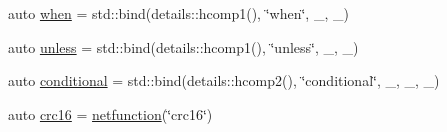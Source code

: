 \begin{DoxyCompactItemize}
\item 
auto \hyperlink{namespacepfq__lang_1_1anonymous__namespace_02default_8hpp_03_a10e1a2f363aa41a978622f322ac6241f}{when} = std\+::bind(details\+::hcomp1(), \char`\"{}when\char`\"{}, \+\_, \+\_)
\item 
auto \hyperlink{namespacepfq__lang_1_1anonymous__namespace_02default_8hpp_03_af01f3831a7b0294b6ffef87a09b481d7}{unless} = std\+::bind(details\+::hcomp1(), \char`\"{}unless\char`\"{}, \+\_, \+\_)
\item 
auto \hyperlink{namespacepfq__lang_1_1anonymous__namespace_02default_8hpp_03_a022d0075edf2fff575b93377aec0c228}{conditional} = std\+::bind(details\+::hcomp2(), \char`\"{}conditional\char`\"{}, \+\_, \+\_, \+\_)
\item 
auto \hyperlink{namespacepfq__lang_1_1anonymous__namespace_02default_8hpp_03_aaa12e1daf6bd2719a3b8592e673acf84}{crc16} = \hyperlink{namespacepfq__lang_a9f546a4602872df5ca74050ecb68a6b3}{netfunction}(\char`\"{}crc16\char`\"{})
\end{DoxyCompactItemize}



